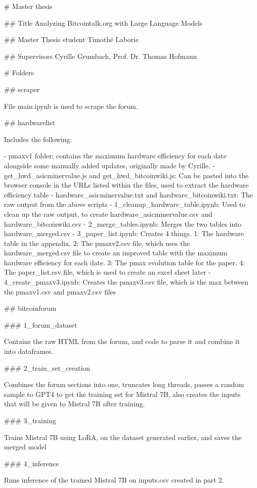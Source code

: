 # Master thesis

## Title
Analyzing Bitcointalk.org with Large Language Models

## Master Thesis student
Timothé Laborie

## Supervisors
Cyrille Grumbach, Prof. Dr. Thomas Hofmann


# Folders

## scraper

File main.ipynb is used to scrape the forum.


## hardwarelist

Includes the following:

- pmaxv1 folder: contains the maximum hardware efficiency for each date alongside some manually added updates, originally made by Cyrille.
- get_hwd_asicminervalue.js and get_hwd_bitcoinwiki.js: Can be pasted into the browser console in the URLs listed within the files, used to extract the hardware efficiency table
- hardware_asicminervalue.txt and hardware_bitcoinwiki.txt: The raw output from the above scripts
- 1_cleanup_hardware_table.ipynb: Used to clean up the raw output, to create hardware_asicminervalue.csv and hardware_bitcoinwiki.csv
- 2_merge_tables.ipynb: Merges the two tables into hardware_merged.csv
- 3_paper_list.ipynb: Creates 4 things. 1: The hardware table in the appendix. 2: The pmaxv2.csv file, which uses the hardware_merged.csv file to create an improved table with the maximum hardware efficiency for each date. 3: The pmax evolution table for the paper. 4: The paper_list.csv file, which is used to create an excel sheet later
- 4_create_pmaxv3.ipynb: Creates the pmaxv3.csv file, which is the max between the pmaxv1.csv and pmaxv2.csv files


## bitcoinforum

### 1_forum_dataset

Contains the raw HTML from the forum, and code to parse it and combine it into dataframes.

### 2_train_set_creation

Combines the forum sections into one, truncates long threads, passes a random sample to GPT4 to get the training set for Mistral 7B, also creates the inputs that will be given to Mistral 7B after training.

### 3_training

Trains Mistral 7B using LoRA, on the dataset generated earlier, and saves the merged model


### 4_inference

Runs inference of the trained Mistral 7B on inputs.csv created in part 2.

